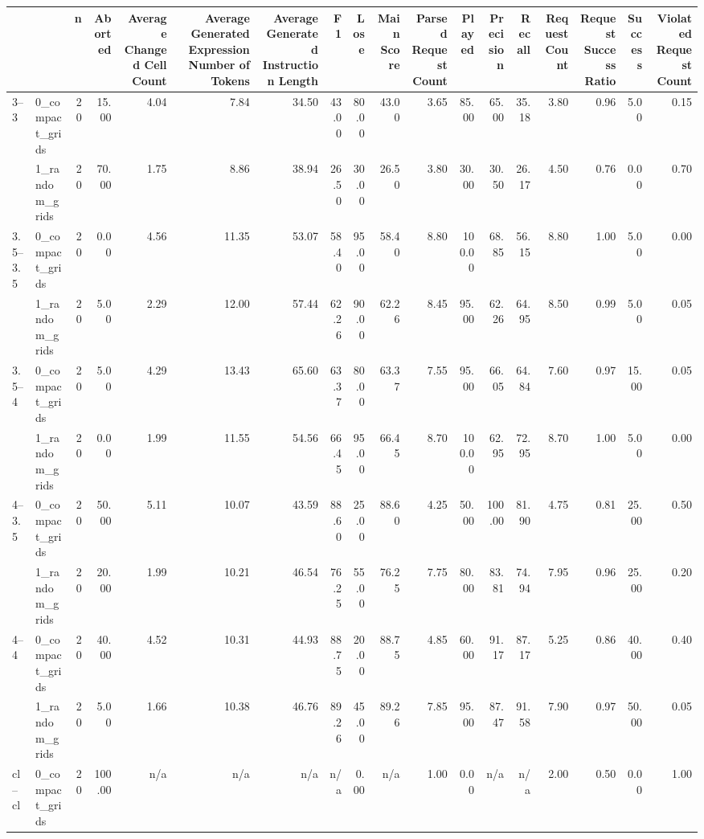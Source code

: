 \begin{tabular}{llrrrrrrrrrrrrrrrr}
\toprule
 &  & n & Aborted & Average Changed Cell Count & Average Generated Expression Number of Tokens & Average Generated Instruction Length & F1 & Lose & Main Score & Parsed Request Count & Played & Precision & Recall & Request Count & Request Success Ratio & Success & Violated Request Count \\
\midrule
\multirow[t]{2}{*}{3--3} & 0_compact_grids & 20 & 15.00 & 4.04 & 7.84 & 34.50 & 43.00 & 80.00 & 43.00 & 3.65 & 85.00 & 65.00 & 35.18 & 3.80 & 0.96 & 5.00 & 0.15 \\
 & 1_random_grids & 20 & 70.00 & 1.75 & 8.86 & 38.94 & 26.50 & 30.00 & 26.50 & 3.80 & 30.00 & 30.50 & 26.17 & 4.50 & 0.76 & 0.00 & 0.70 \\
\cline{1-18}
\multirow[t]{2}{*}{3.5--3.5} & 0_compact_grids & 20 & 0.00 & 4.56 & 11.35 & 53.07 & 58.40 & 95.00 & 58.40 & 8.80 & 100.00 & 68.85 & 56.15 & 8.80 & 1.00 & 5.00 & 0.00 \\
 & 1_random_grids & 20 & 5.00 & 2.29 & 12.00 & 57.44 & 62.26 & 90.00 & 62.26 & 8.45 & 95.00 & 62.26 & 64.95 & 8.50 & 0.99 & 5.00 & 0.05 \\
\cline{1-18}
\multirow[t]{2}{*}{3.5--4} & 0_compact_grids & 20 & 5.00 & 4.29 & 13.43 & 65.60 & 63.37 & 80.00 & 63.37 & 7.55 & 95.00 & 66.05 & 64.84 & 7.60 & 0.97 & 15.00 & 0.05 \\
 & 1_random_grids & 20 & 0.00 & 1.99 & 11.55 & 54.56 & 66.45 & 95.00 & 66.45 & 8.70 & 100.00 & 62.95 & 72.95 & 8.70 & 1.00 & 5.00 & 0.00 \\
\cline{1-18}
\multirow[t]{2}{*}{4--3.5} & 0_compact_grids & 20 & 50.00 & 5.11 & 10.07 & 43.59 & 88.60 & 25.00 & 88.60 & 4.25 & 50.00 & 100.00 & 81.90 & 4.75 & 0.81 & 25.00 & 0.50 \\
 & 1_random_grids & 20 & 20.00 & 1.99 & 10.21 & 46.54 & 76.25 & 55.00 & 76.25 & 7.75 & 80.00 & 83.81 & 74.94 & 7.95 & 0.96 & 25.00 & 0.20 \\
\cline{1-18}
\multirow[t]{2}{*}{4--4} & 0_compact_grids & 20 & 40.00 & 4.52 & 10.31 & 44.93 & 88.75 & 20.00 & 88.75 & 4.85 & 60.00 & 91.17 & 87.17 & 5.25 & 0.86 & 40.00 & 0.40 \\
 & 1_random_grids & 20 & 5.00 & 1.66 & 10.38 & 46.76 & 89.26 & 45.00 & 89.26 & 7.85 & 95.00 & 87.47 & 91.58 & 7.90 & 0.97 & 50.00 & 0.05 \\
\cline{1-18}
\multirow[t]{2}{*}{cl--cl} & 0_compact_grids & 20 & 100.00 & n/a & n/a & n/a & n/a & 0.00 & n/a & 1.00 & 0.00 & n/a & n/a & 2.00 & 0.50 & 0.00 & 1.00 \\

\end{tabular}
